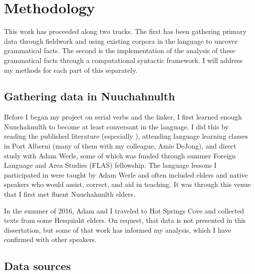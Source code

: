 \chapter{Methodology} \label{ch:methodology}

This work has proceeded along two tracks. The first has been gathering primary data through fieldwork and using existing corpora in the language to uncover grammatical facts. The second is the implementation of the analysis of these grammatical facts through a computational syntactic framework. I will address my methods for each part of this separately.

\section{Gathering data in Nuuchahnulth} \label{ch:method:ncn}

Before I began my project on serial verbs and the linker, I first learned enough Nuuchahnulth to become at least conversant in the language. I did this by reading the published literature (especially \citealt{sapir1939}), attending language learning classes in Port Alberni (many of them with my colleague, Amie DeJong), and direct study with Adam Werle, some of which was funded through summer Foreign Language and Area Studies (FLAS) fellowship. The language lessons I participated in were taught by Adam Werle and often included elders and native speakers who would assist, correct, and aid in teaching. It was through this venue that I first met fluent Nuuchahnulth elders.

In the summer of 2016, Adam and I traveled to Hot Springs Cove and collected texts from some Hesquiaht elders. On request, that data is not presented in this dissertation, but some of that work has informed my analysis, which I have confirmed with other speakers.

\section{Data sources} \label{ch:method:sources}

